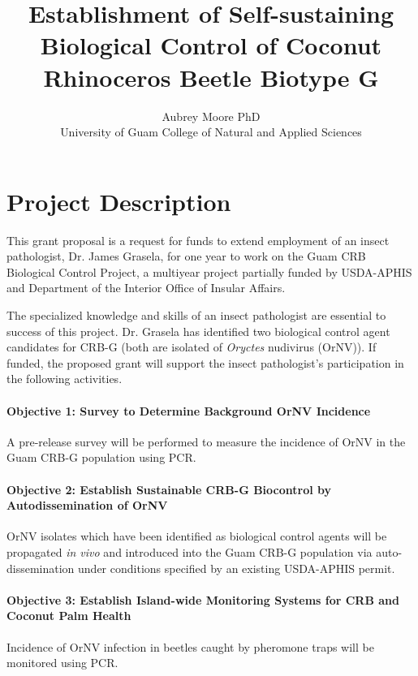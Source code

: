 \documentclass[12pt,letterpaper,english,bibliography=totocnumbered, abstract=on]{scrartcl}
\begin{document}
\titlehead{Grant Proposal: USDA Forest Service FY2020}

\title{Establishment of Self-sustaining Biological Control of Coconut Rhinoceros Beetle Biotype G}

\author{Aubrey Moore PhD\\University of Guam College of Natural and Applied Sciences}

\maketitle
\newpage
\tableofcontents

\pagebreak

\section{Project Description}

This grant proposal is a request for funds to extend employment of an insect pathologist,
Dr. James Grasela, for one year to work on the Guam CRB Biological Control Project, a multiyear project partially funded by
USDA-APHIS and Department of the Interior Office of Insular Affairs.

The specialized knowledge and skills of an insect pathologist are essential to success of this project. 
Dr. Grasela has identified two biological control agent candidates for CRB-G (both are isolated of \textit{Oryctes} nudivirus (OrNV)).
If funded, the proposed grant will support the insect pathologist's participation in the following activities.

\paragraph{Objective 1: Survey to Determine Background OrNV Incidence} 
A pre-release survey will be performed to measure the incidence of OrNV in the Guam CRB-G population using PCR.

\paragraph{Objective 2: Establish Sustainable CRB-G Biocontrol by Autodissemination of OrNV}
OrNV isolates which have been identified as biological control agents will be propagated \textit{in vivo} and
introduced into the Guam CRB-G population via auto-dissemination under conditions specified by an existing USDA-APHIS permit.

\paragraph{Objective 3:  Establish Island-wide Monitoring Systems for CRB and Coconut Palm Health}
Incidence of OrNV infection in beetles caught by pheromone traps will be monitored using PCR. 
\end{document}
